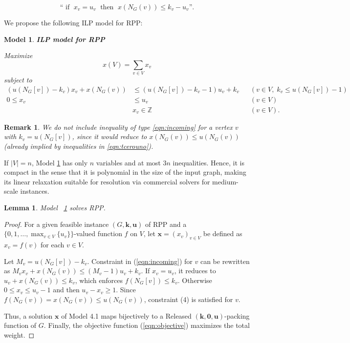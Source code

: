 \documentclass[preprint,12pt]{article}
\renewcommand{\leq}{\leqslant}
\newtheorem{lemma}[theorem]{Lemma}
\newtheorem{model}[theorem]{Model}
\newtheorem{remark}[theorem]{Remark}
\theoremstyle{definition}
\begin{document}
\begin{equation}\label{eq1} \text{`` if } \;  x_v =u_v \; \text{ then } \; x( N_G(v)) \leq k_v - u_v\text{''.} 
\end{equation}

We propose the following ILP model for  RPP:

\begin{model}
\label{model1}
\textbf{ILP model for RPP}
\par
\medskip
\noindent Maximize 
\begin{equation}
x(V)=\sum_{v \in V} x_{v}
 \label{eqn:objective}
\end{equation}
subject to
\begin{align}
  \left(u(N_G[v])-k_v \right)x_v + x(N_G(v)) 
 & \leqslant \left(u(N_G[v])-k_v  - 1\right)
    u_v + k_v  && (v\in V,\;   k_v\leq u(N_G[v])-1 ) 
\label{eqn:incoming} \\
0\leq x_{v} & \leq  u_v && (v \in V)\label{eqn:tcerouno}\\
&x_v \in \mathbb{Z} && (v \in V). 
\end{align}
\end{model}


\begin{remark}
    We do not include inequality of type \eqref{eqn:incoming} for a vertex $v$ with $k_v=u(N_G[v])$, since it would reduce to $x(N_G(v))\leq u(N_G(v))$ (already implied by inequalities in \eqref{eqn:tcerouno}).
\end{remark}

If $|V|=n$, Model \ref{model1} has only $n$ variables and at most $3n$ inequalities. Hence, it is compact in the sense that it is polynomial in the size of the input graph, making its linear relaxation suitable for resolution via commercial solvers for medium-scale instances.
\begin{lemma}
Model ~\ref{model1} solves RPP.
\end{lemma}


\begin{proof} 
For a given feasible instance $(G, \mathbf{k}, \mathbf{u})$ of RPP and a $\{0,1,\dots,\max_{v\in V}\{u_v\}\}$-valued function $f$ on $V$, let $\mathbf{x}=(x_v)_{v \in V}$ be defined as $x_v = f(v)$ for each $v \in V$. 

Let $M_v = u( N_G[v])  - k_v$. Constraint in (\ref{eqn:incoming}) for $v$ can be rewritten as $M_v x_v + x( N_G(v)) \le (M_v - 1) u_v + k_v$.
If $x_v = u_v$, it reduces to $u_v + x( N_G(v))  \le k_v$, which enforces $f(N_G[v]) \le k_v$.
Otherwise $0 \le x_v \le u_v - 1$ and  then $u_v - x_v \ge 1$. Since $f(N_G(v)) = x(N_G(v)) \le u(N_G(v))$, constraint (4) is satisfied for $v$. 

Thus, a solution $\mathbf{x}$ of Model 4.1 maps bijectively to a Released $(\mathbf{k}, \mathbf{0}, \mathbf{u})$-packing function of $G$. Finally, the objective function (\ref{eqn:objective}) maximizes the total weight.

\end{proof}
\end{document}
